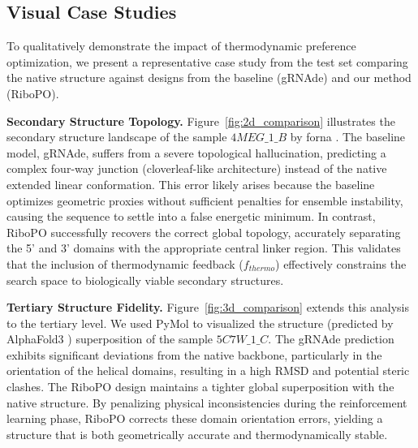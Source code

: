 {{\subsection{{Visual Case Studies}}
\label{subsec:visuals}

To qualitatively demonstrate the impact of thermodynamic preference optimization, we present a representative case study from the test set comparing the native structure against designs from the baseline (gRNAde) and our method (RiboPO).

\textbf{Secondary Structure Topology.} Figure~\ref{fig:2d_comparison} illustrates the secondary structure landscape of the sample $4MEG\_1\_B$ by forna \citep{Kerpedjiev2015forna}. The baseline model, gRNAde, suffers from a severe topological hallucination, predicting a complex four-way junction (cloverleaf-like architecture) instead of the native extended linear conformation. This error likely arises because the baseline optimizes geometric proxies without sufficient penalties for ensemble instability, causing the sequence to settle into a false energetic minimum. In contrast, RiboPO successfully recovers the correct global topology, accurately separating the 5' and 3' domains with the appropriate central linker region. This validates that the inclusion of thermodynamic feedback ($f_{thermo}$) effectively constrains the search space to biologically viable secondary structures.

\textbf{Tertiary Structure Fidelity.} Figure~\ref{fig:3d_comparison} extends this analysis to the tertiary level. We used PyMol \citep{pymol} to visualized the structure (predicted by AlphaFold3 \citep{abramson2024accurate}) superposition of the sample $5C7W\_1\_C$. The gRNAde prediction exhibits significant deviations from the native backbone, particularly in the orientation of the helical domains, resulting in a high RMSD and potential steric clashes. The RiboPO design maintains a tighter global superposition with the native structure. By penalizing physical inconsistencies during the reinforcement learning phase, RiboPO corrects these domain orientation errors, yielding a structure that is both geometrically accurate and thermodynamically stable.

}}
